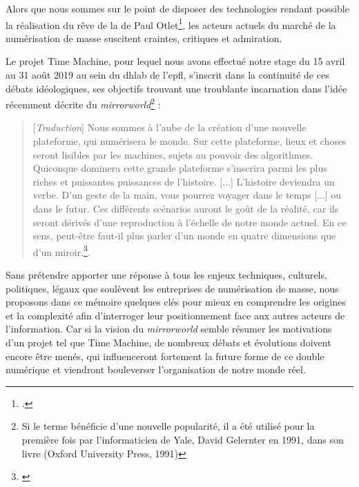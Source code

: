 Alors que nous sommes sur le point de disposer des technologies rendant possible la réalisation du rêve de la  de Paul Otlet\footcite{thylstrup_politics_2018}, les acteurs actuels du marché de la numérisation de masse suscitent craintes, critiques et admiration. 

Le projet Time Machine, pour lequel nous avons effectué notre stage du 15 avril au 31 août 2019 au sein du \gls{dhlab} de l'\gls{epfl}, s'inscrit dans la continuité de ces débats idéologiques, ses objectifs trouvant une troublante incarnation dans l'idée récemment décrite du \textit{mirrorworld}\footnote{Si le terme bénéficie d'une nouvelle popularité, il a été utilisé pour la première fois par l'informaticien de Yale, David Gelernter en 1991, dans son livre (Oxford University Press, 1991)}  : 

\begin{quotation}
[\textit{Traduction}]
Nous sommes à l'aube de la création d'une nouvelle plateforme, qui numérisera le monde. Sur cette plateforme, lieux et choses seront lisibles par les machines, sujets au pouvoir des algorithmes. Quiconque dominera cette grande plateforme s'inscrira parmi les plus riches et puissantes puissances de l'histoire. [...] L'histoire deviendra un verbe. D'un geste de la main, vous pourrez voyager dans le temps [...] ou dans le futur. Ces différents scénarios auront le goût de la réalité, car ils seront dérivés d'une reproduction à l'échelle de notre monde actuel. En ce sens, peut-être faut-il plus parler d'un monde en quatre dimensions que d'un miroir.\footnote{\cite{kelly_ar_2019}}.
\end{quotation}

Sans prétendre apporter une réponse à tous les enjeux techniques, culturels, politiques, légaux que soulèvent les entreprises de numérisation de masse, nous 
proposons dans ce mémoire quelques clés pour mieux en comprendre les origines et la complexité afin d'interroger leur positionnement face aux autres acteurs de l'information. Car si la vision du \textit{mirrorworld} semble résumer les motivations d'un projet tel que Time Machine, de nombreux débats et évolutions doivent encore être menés, qui influenceront fortement la future forme de ce double numérique et viendront bouleverser l'organisation de notre monde réel.

